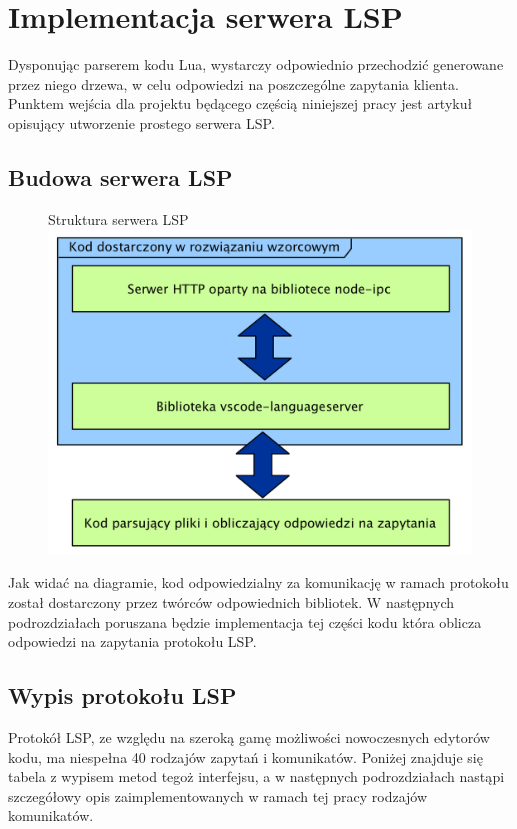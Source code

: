 \chapter{Implementacja serwera LSP}
Dysponując parserem kodu Lua, wystarczy odpowiednio przechodzić generowane przez niego drzewa, w celu odpowiedzi na poszczególne zapytania klienta. Punktem wejścia dla projektu będącego częścią niniejszej pracy jest artykuł \cite{lsp_sample} opisujący utworzenie prostego serwera LSP.

\section{Budowa serwera LSP}
\begin{figure}[H]
\centering
Struktura serwera LSP
\includegraphics[scale=0.6]{Chapters/struktura_serwera}
\end{figure}

Jak widać na diagramie, kod odpowiedzialny za komunikację w ramach protokołu został dostarczony przez twórców odpowiednich bibliotek. W następnych podrozdziałach poruszana będzie implementacja tej części kodu która oblicza odpowiedzi na zapytania protokołu LSP.

\section{Wypis protokołu LSP}
Protokół LSP, ze względu na szeroką gamę możliwości nowoczesnych edytorów kodu, ma niespełna 40 rodzajów zapytań i komunikatów. Poniżej znajduje się tabela z wypisem metod tegoż interfejsu, a w następnych podrozdziałach nastąpi szczegółowy opis zaimplementowanych w ramach tej pracy rodzajów komunikatów.

